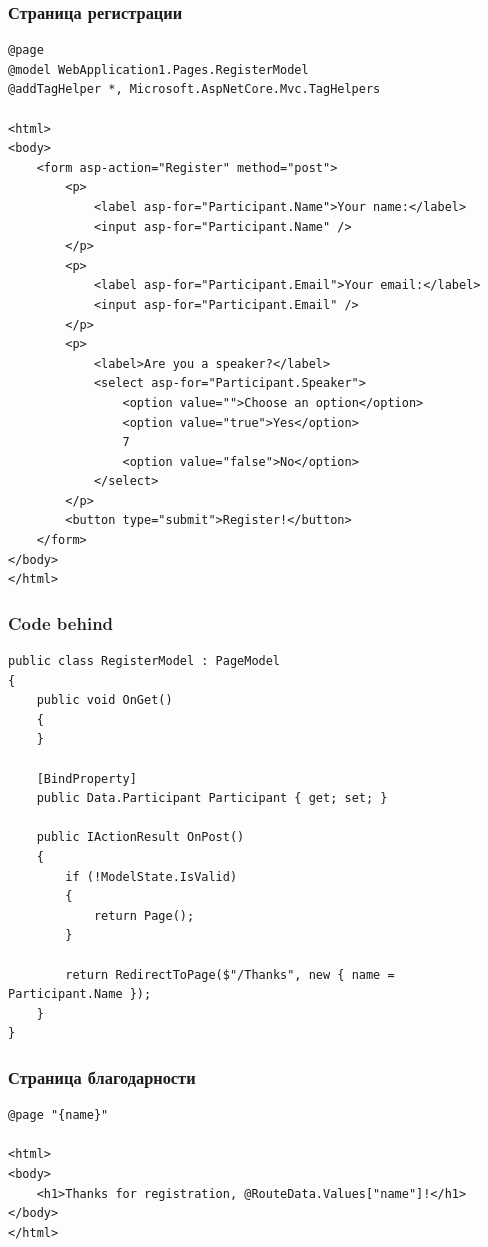 \documentclass[xetex,mathserif,serif]{beamer}
\begin{document}
	\begin{frame}[fragile]
		\frametitle{Страница регистрации}
		\begin{ssmall}
			\begin{verbatim}
@page
@model WebApplication1.Pages.RegisterModel
@addTagHelper *, Microsoft.AspNetCore.Mvc.TagHelpers

<html>
<body>
    <form asp-action="Register" method="post">
        <p>
            <label asp-for="Participant.Name">Your name:</label>
            <input asp-for="Participant.Name" />
        </p>
        <p>
            <label asp-for="Participant.Email">Your email:</label>
            <input asp-for="Participant.Email" />
        </p>
        <p>
            <label>Are you a speaker?</label>
            <select asp-for="Participant.Speaker">
                <option value="">Choose an option</option>
                <option value="true">Yes</option>
                7
                <option value="false">No</option>
            </select>
        </p>
        <button type="submit">Register!</button>
    </form>
</body>
</html>
			\end{verbatim}
		\end{ssmall}
	\end{frame}

	\begin{frame}[fragile]
		\frametitle{Code behind}
		\begin{footnotesize}
			\begin{verbatim}
public class RegisterModel : PageModel
{
    public void OnGet()
    {
    }

    [BindProperty]
    public Data.Participant Participant { get; set; }

    public IActionResult OnPost()
    {
        if (!ModelState.IsValid)
        {
            return Page();
        }

        return RedirectToPage($"/Thanks", new { name = Participant.Name });
    }
}
			\end{verbatim}
		\end{footnotesize}
	\end{frame}

	\begin{frame}[fragile]
		\frametitle{Страница благодарности}
		\begin{small}
			\begin{verbatim}
@page "{name}"

<html>
<body>
    <h1>Thanks for registration, @RouteData.Values["name"]!</h1>
</body>
</html>
			\end{verbatim}
		\end{small}
	\end{frame}
\end{document}
